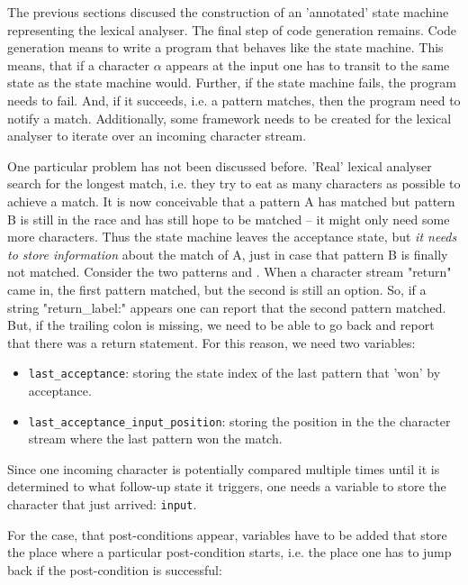 The previous sections discused the construction of an 'annotated'
state machine representing the lexical analyser. The final step
of code generation remains. Code generation means to write a program
that behaves like the state machine. This means, that if a character $\alpha$
appears at the input one has to transit to the same state as the state machine
would. Further, if the state machine fails, the program needs to fail. And,
    if it succeeds, i.e. a pattern matches, then the program need to notify 
    a match. Additionally, some framework needs to be created for the 
    lexical analyser to iterate over an incoming character stream. 
    
    
    One particular problem has not been discussed before. 'Real' lexical
    analyser search for the longest match, i.e. they try to eat as many
    characters as possible to achieve a match. It is now conceivable that a
    pattern A has matched but pattern B is still in the race and has still hope
    to be matched -- it might only need some more characters. Thus the state
    machine leaves the acceptance state, but {\it it needs to store
	information} about the match of A, just in case that pattern B is
	finally not matched. Consider the two patterns  and
	. When a character stream "return" came in, 
	the first pattern matched, but the second is still an option. So,
	if a string "return\_label:" appears one can report that the second 
	pattern matched. But, if the trailing colon is missing, we need to be
	able to go back and report that there was a return statement.
	For this reason, we need two variables:

	\begin{itemize}
	    \item {\tt last\_acceptance}: storing the state index of the last pattern 
	    	that 'won' by acceptance.
	    \item {\tt last\_acceptance\_input\_position}: storing the position in the
    	       the character stream where the last pattern won the match.	    
	\end{itemize}

    Since one incoming character is potentially compared multiple times until it
    is determined to what follow-up state it triggers, one needs a variable to store
    the character that just arrived: {\tt input}.
    
    For the case, that post-conditions
    appear, variables have to be added that store the place where a particular
    post-condition starts, i.e. the place one has to jump back if the post-condition
    is successful:

